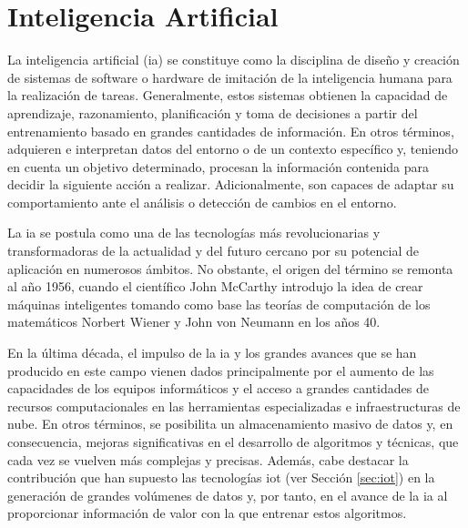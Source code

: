\section{Inteligencia Artificial}
\label{sec:ml}

La inteligencia artificial (\gls{ia}) se constituye como la disciplina de diseño y creación de sistemas de software o hardware de imitación de la inteligencia humana para la realización de tareas. Generalmente, estos sistemas obtienen la capacidad de aprendizaje, razonamiento, planificación y toma de decisiones a partir del entrenamiento basado en grandes cantidades de información. En otros términos, adquieren e interpretan datos del entorno o de un contexto específico y, teniendo en cuenta un objetivo determinado, procesan la información contenida para decidir la siguiente acción a realizar. Adicionalmente, son capaces de adaptar su comportamiento ante el análisis o detección de cambios en el entorno. \cite{iagov} \cite{iaazure}

\vspace{3mm}

La \gls{ia} se postula como una de las tecnologías más revolucionarias y transformadoras de la actualidad y del futuro cercano por su potencial de aplicación en numerosos ámbitos. No obstante, el origen del término se remonta al año 1956, cuando el científico John McCarthy introdujo la idea de crear máquinas inteligentes tomando como base las teorías de computación de los matemáticos Norbert Wiener y John von Neumann en los años 40.~\cite{iagov}

\vspace{3mm}

En la última década, el impulso de la \gls{ia} y los grandes avances que se han producido en este campo vienen dados principalmente por el aumento de las capacidades de los equipos informáticos y el acceso a grandes cantidades de recursos computacionales en las herramientas especializadas e infraestructuras de nube. En otros términos, se posibilita un almacenamiento masivo de datos y, en consecuencia, mejoras significativas en el desarrollo de algoritmos y técnicas, que cada vez se vuelven más complejas y precisas. Además, cabe destacar la contribución que han supuesto las tecnologías \gls{iot} (ver Sección \ref{sec:iot}) en la generación de grandes volúmenes de datos y, por tanto, en el avance de la \gls{ia} al proporcionar información de valor con la que entrenar estos algoritmos.

